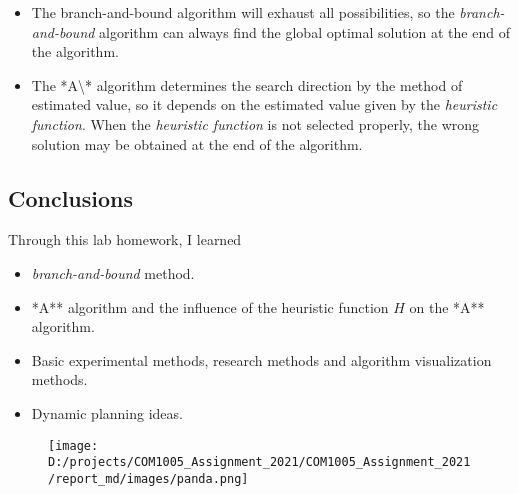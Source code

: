 \documentclass[
]{article}
\begin{document}
\begin{enumerate}
  \begin{itemize}
  \item
    The branch-and-bound algorithm will exhaust all possibilities, so
    the \emph{branch-and-bound} algorithm can always find the global
    optimal solution at the end of the algorithm.
  \item
    The *A\textbackslash** algorithm determines the search direction by
    the method of estimated value, so it depends on the estimated value
    given by the \emph{heuristic function}. When the \emph{heuristic
    function} is not selected properly, the wrong solution may be
    obtained at the end of the algorithm.
  \end{itemize}
\end{enumerate}

\hypertarget{header-n488}{%
\subsection{Conclusions}\label{header-n488}}

Through this lab homework, I learned

\begin{itemize}
\item
  \emph{branch-and-bound} method.
\item
  *A** algorithm and the influence of the heuristic function \(H\) on
  the *A** algorithm.
\item
  Basic experimental methods, research methods and algorithm
  visualization methods.
\item
  Dynamic planning ideas.
\end{itemize}

\begin{figure}
\centering
\texttt{[image: D:/projects/COM1005\_Assignment\_2021/COM1005\_Assignment\_2021/report\_md/images/panda.png]}
\caption{}
\end{figure}
\end{document}
